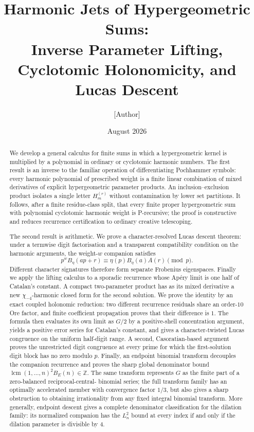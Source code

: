 \documentclass[11pt]{article}
\title{Harmonic Jets of Hypergeometric Sums:\\
Inverse Parameter Lifting, Cyclotomic Holonomicity, and Lucas Descent}
\author{[Author]}
\date{August 2026}
\theoremstyle{definition}
\theoremstyle{remark}
\begin{document}
\maketitle

\begin{abstract}
We develop a general calculus for finite sums in which a hypergeometric kernel is
multiplied by a polynomial in ordinary or cyclotomic harmonic numbers.  The first result
is an inverse to the familiar operation of differentiating Pochhammer symbols: every
harmonic polynomial of prescribed weight is a finite linear combination of mixed
derivatives of explicit hypergeometric parameter products.  An inclusion--exclusion
product isolates a single letter $H_m^{(r)}$ without contamination by lower set
partitions.  It follows, after a finite residue-class split, that every finite proper
hypergeometric sum with polynomial cyclotomic harmonic weight is P-recursive; the proof
is constructive and reduces recurrence certification to ordinary creative telescoping.

The second result is arithmetic.  We prove a character-resolved Lucas descent theorem:
under a termwise digit factorisation and a transparent compatibility condition on the
harmonic arguments, the weight-$w$ companion satisfies
\[
 p^w B_\eta(ap+r)\equiv \eta(p)B_\eta(a)A(r)\pmod p.
\]
Different character signatures therefore form separate Frobenius eigenspaces.  Finally
we apply the lifting calculus to a sporadic recurrence whose Ap\'ery limit is one half of
Catalan's constant.  A compact two-parameter product has as its mixed derivative a new
$\chi_{-4}$-harmonic closed form for the second solution.  We prove the identity by an
exact coupled holonomic reduction: two different recurrence residuals share an order-$10$
Ore factor, and finite coefficient propagation proves that their difference is $1$.
The formula then evaluates its own limit as $G/2$ by a positive-shell concentration
argument, yields a positive error series for Catalan's constant, and gives a
character-twisted Lucas congruence on the uniform half-digit range.  A second,
Casoratian-based argument proves the unrestricted digit congruence at every prime for
which the first-solution digit block has no zero modulo $p$.  Finally, an endpoint
binomial transform decouples the companion recurrence and proves the sharp global
denominator bound $\operatorname{lcm}(1,\ldots,n)^2B_E(n)\in\mathbb Z$.  The same
transform represents $G$ as the finite part of a zero-balanced reciprocal-central-
binomial series; the full transform family has an optimally accelerated member with
convergence factor $1/3$, but also gives a sharp obstruction to obtaining irrationality
from any fixed integral binomial transform.  More generally, endpoint descent gives a
complete denominator classification for the dilation family: its normalized companion
has the $L_n^2$ bound at every index if and only if the dilation parameter is divisible
by $4$.
\end{abstract}
\end{document}
